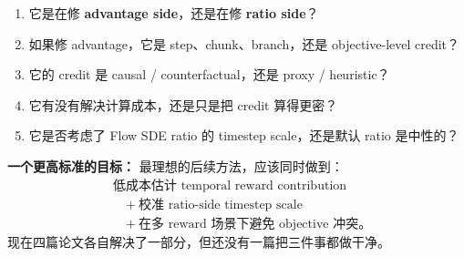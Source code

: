 \begin{enumerate}[leftmargin=1.5em]
  \item 它是在修 \textbf{advantage side}，还是在修 \textbf{ratio side}？
  \item 如果修 advantage，它是 step、chunk、branch，还是 objective-level credit？
  \item 它的 credit 是 causal / counterfactual，还是 proxy / heuristic？
  \item 它有没有解决计算成本，还是只是把 credit 算得更密？
  \item 它是否考虑了 Flow SDE ratio 的 timestep scale，还是默认 ratio 是中性的？
\end{enumerate}

\begin{intubox}
\textbf{一个更高标准的目标：} 最理想的后续方法，应该同时做到：
\[
\begin{aligned}
&\text{低成本估计 temporal reward contribution}\\
&\quad +\ \text{校准 ratio-side timestep scale}\\
&\quad +\ \text{在多 reward 场景下避免 objective 冲突。}
\end{aligned}
\]
现在四篇论文各自解决了一部分，但还没有一篇把三件事都做干净。
\end{intubox}
